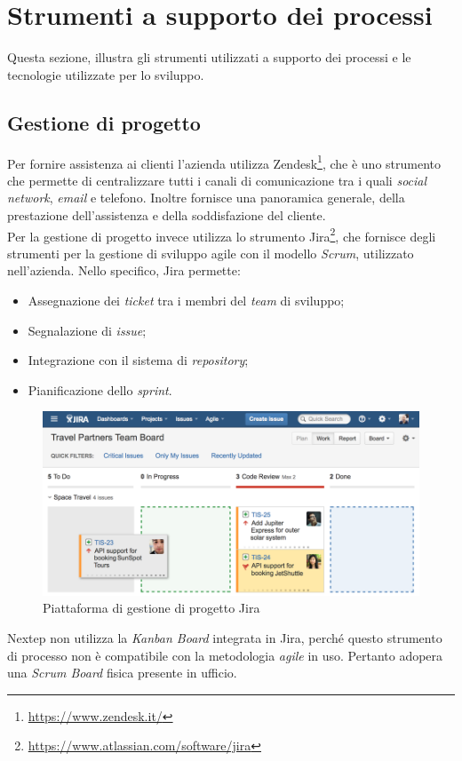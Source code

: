 \section{Strumenti a supporto dei processi}
Questa sezione, illustra gli strumenti utilizzati a supporto dei processi e le tecnologie utilizzate per lo sviluppo.
\subsection{Gestione di progetto}
Per fornire assistenza ai clienti l'azienda utilizza Zendesk\footnote{\url{https://www.zendesk.it/}}, che è uno strumento che permette di centralizzare tutti i canali di comunicazione tra i quali \emph{social network}, \emph{email} e telefono. Inoltre fornisce una panoramica generale, della prestazione dell'assistenza e della soddisfazione del cliente.\\Per la gestione di progetto invece utilizza lo strumento Jira\footnote{\url{https://www.atlassian.com/software/jira}}, che fornisce degli strumenti per la gestione di sviluppo agile con il modello \emph{Scrum}, utilizzato nell'azienda. Nello specifico, Jira permette:
\begin{itemize}
\item Assegnazione dei \emph{ticket} tra i membri del \emph{team} di sviluppo;
\item Segnalazione di \emph{issue};
\item Integrazione con il sistema di \emph{repository};
\item Pianificazione dello \emph{sprint}.
\end{itemize}
\begin{figure}[h]
\centering
\includegraphics[scale=0.4]{immagini/jira}
\caption{Piattaforma di gestione di progetto Jira}
\label{fig:jira}
\end{figure}
Nextep non utilizza la \emph{Kanban Board} integrata in Jira, perché questo strumento di processo non è compatibile con la metodologia \emph{agile} in uso. Pertanto adopera una \emph{Scrum Board} fisica presente in ufficio.
\newpage
